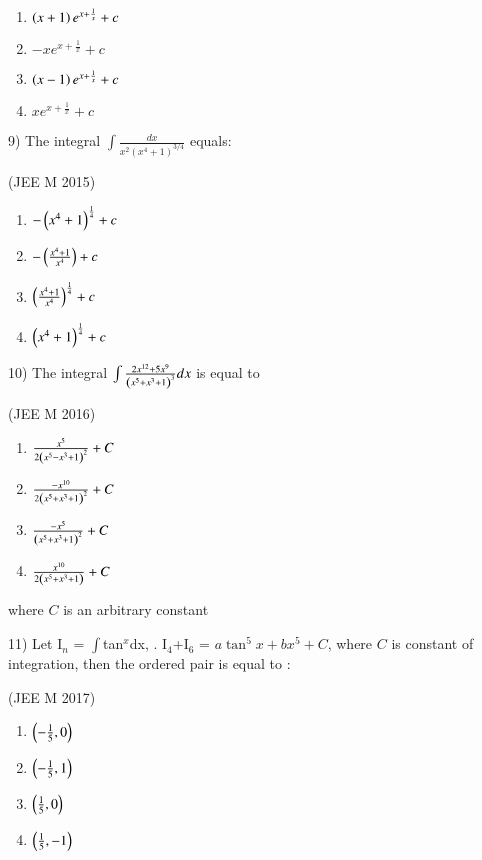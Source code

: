 \documentclass[journal,12pt,twocolumn]{IEEEtran}
\theoremstyle{remark}
\begin{document}
		\begin{multicols}{2}
			\begin{enumerate}[label=(\alph*)]
				\item $\left(x+1\right)e^{x+\frac{1}{x}}+c$
				\item $-xe^{x+\frac{1}{x}}+c$
				\item $\left(x-1\right)e^{x+\frac{1}{x}}+c$
				\item $xe^{x+\frac{1}{x}}+c$
			\end{enumerate}
		\end{multicols}

9)
	 The integral $\int\frac{dx}{x^2(x^4+1)^{3/4}}$ equals:

		\hfill{(JEE M 2015)}

		\begin{multicols}{2}
			\begin{enumerate}[label=(\alph*)]
				\item $-\left(x^4+1\right)^{\frac{1}{4}}+c$
				\item $-\left(\frac{x^4+1}{x^4}\right)+c$
				\item $\left(\frac{x^4+1}{x^4}\right)^{\frac{1}{4}}+c$
				\item $\left(x^4+1\right)^{\frac{1}{4}}+c$
			\end{enumerate}
		\end{multicols}

10)
	 The integral $\int\frac{2x^{12}+5x^9}{\left(x^5+x^3+1\right)^3}dx$ is equal to

		\hfill{(JEE M 2016)}

		\begin{multicols}{2}
			\begin{enumerate}[label=(\alph*)]
				\item $\frac{x^5}{2\left(x^5-x^3+1\right)^2}+C$
				\item $\frac{-x^{10}}{2\left(x^5+x^3+1\right)^2}+C$
				\item $\frac{-x^5}{\left(x^5+x^3+1\right)^2}+C$
				\item $\frac{x^{10}}{2\left(x^5+x^3+1\right)}+C$
			\end{enumerate}
		\end{multicols}
		where $C$ is an arbitrary constant

11)
	 Let I$_n$ = $\int$tan$^x$dx, . I$_4$+I$_6$ = $a \tan^5x + bx^5 + C$, where $C$ is constant of integration, then the ordered pair  is equal to :

		\hfill{(JEE M 2017)}

		\begin{multicols}{4}
			\begin{enumerate}[label=(\alph*)]
				\item$\left(-\frac{1}{5}, 0\right)$
					
				\item$\left(-\frac{1}{5}, 1\right)$
					
				\item$\left(\frac{1}{5}, 0\right)$
					
				\item$\left(\frac{1}{5}, -1\right)$
			\end{enumerate}
		\end{multicols}
		
\end{document}
